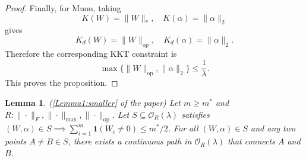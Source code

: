 \documentclass{article}
\newtheorem{lemma}{Lemma}[section]
\newcommand{\op}{\mathrm{op}}
\begin{document}
\begin{proof}
Finally, for Muon, taking
\[
    K(W)=\|W\|_*,
    \quad
    K(\alpha)=\|\alpha\|_2
\]
gives
\[
    K_d(W)=\|W\|_{\mathrm{op}},
    \quad
    K_d(\alpha)=\|\alpha\|_2.
\]
Therefore the corresponding KKT constraint is
\[
    \max\{\|W\|_{\mathrm{op}},\|\alpha\|_2\}
    \le \frac1\lambda .
\]
This proves the proposition.

\end{proof}
\begin{lemma}
\label{AppxLemma1:smaller} (\cref{Lemma1:smaller} of the paper)
Let $m \ge m^*$ and $R: \|\cdot\|_F, \|\cdot\|_{\max}, \|\cdot\|_{\op}$. Let $S \subseteq \mathcal{O}_R(\lambda)$ satisfies $(W, \alpha) \in S \implies \sum_{i=1}^m \mathbf{1}(W_i \neq 0) \le m^*/2$. For all $(W, \alpha) \in S$ and any two points $A \ne B \in S$, there exists a continuous path in $\mathcal{O}_R(\lambda)$ that connects $A$ and $B$.
\end{lemma}
\end{document}
